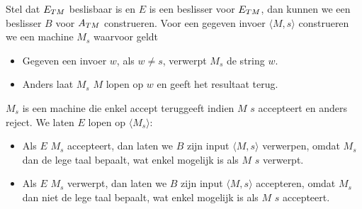   Stel dat ${E_{TM}}$ beslisbaar is en $E$ is een beslisser voor ${E_{TM}}$, dan kunnen we een beslisser $B$ voor ${A_{TM}}$ construeren. Voor een gegeven invoer $\langle M,s \rangle$ construeren we een machine $M_s$ waarvoor geldt
  \begin{itemize}
  \item Gegeven een invoer $w$, als $w \neq s$, verwerpt $M_s$ de string $w$.
  \item Anders laat $M_s$ $M$ lopen op $w$ en geeft het resultaat terug.
  \end{itemize}
  $M_s$ is een machine die enkel accept teruggeeft indien $M$ $s$ accepteert en anders reject. We laten $E$ lopen op $\langle M_s \rangle$:
  \begin{itemize}
  \item Als $E$ $M_s$ accepteert, dan laten we $B$ zijn input $\langle M,s \rangle$ verwerpen, omdat $M_s$ dan de lege taal bepaalt, wat enkel mogelijk is als $M$ $s$ verwerpt.
  \item Als $E$ $M_s$ verwerpt, dan laten we $B$ zijn input $\langle M,s \rangle$ accepteren, omdat $M_s$ dan niet de lege taal bepaalt, wat enkel mogelijk is als $M$ $s$ accepteert.
  \end{itemize}